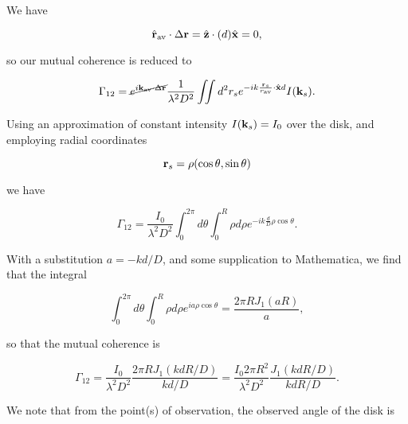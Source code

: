 {

We have

\begin{equation}\label{eqn:modernOptics:ProblemSet2:P3:170}
\hat{\mathbf{r}}_{\text{av}} \cdot \Delta \mathbf{r}
= \hat{\mathbf{z}} \cdot (d) \hat{\mathbf{x}}
= 0,
\end{equation}

so our mutual coherence is reduced to

\begin{equation}\label{eqn:modernOptics:ProblemSet2:P3:190}
\Gamma_{12} 
= 
\cancel{ e^{ i \mathbf{k}_{\text{av}} \cdot \Delta \mathbf{r}} }
\frac{1}{ \lambda^2 D^2 }
\iint d^2 r_s e^{-i k \frac{\mathbf{r}_s}{r_{\text{av}}} \cdot \hat{\mathbf{x}} d } I( \mathbf{k}_s ).
\end{equation}

Using an approximation of constant intensity $I(\mathbf{k}_s) = I_0$ over the disk, and employing radial coordinates

\begin{equation}\label{eqn:modernOptics:ProblemSet2:P3:210}
\mathbf{r}_s = \rho (\cos\theta, \sin\theta)
\end{equation}

we have

\begin{equation}\label{eqn:modernOptics:ProblemSet2:P3:230}
\Gamma_{12} 
= 
\frac{I_0}{ \lambda^2 D^2 }
\int_0^{2 \pi} d\theta 
\int_0^R \rho d\rho
e^{-i k \frac{d}{D} \rho \cos\theta }.
\end{equation}

With a substitution $a = -k d/D$, and some supplication to Mathematica, we find that the integral 

\begin{equation}\label{eqn:modernOptics:ProblemSet2:P3:250}
\int_0^{2 \pi} d\theta 
\int_0^R \rho d\rho
e^{i a \rho \cos\theta }
=
\frac{2 \pi R J_1(a R)}{a},
\end{equation}

so that the mutual coherence is

\begin{equation}\label{eqn:modernOptics:ProblemSet2:P3:270}
\Gamma_{12} 
= 
\frac{I_0}{ \lambda^2 D^2 }
\frac{2 \pi R J_1(k d R/D)}{ k d /D }
= 
\frac{I_0 2 \pi R^2 }{ \lambda^2 D^2 }
\frac{J_1(k d R/D)}{ k d R /D }.
\end{equation}

We note that from the point(s) of observation, the observed angle of the disk is

}
